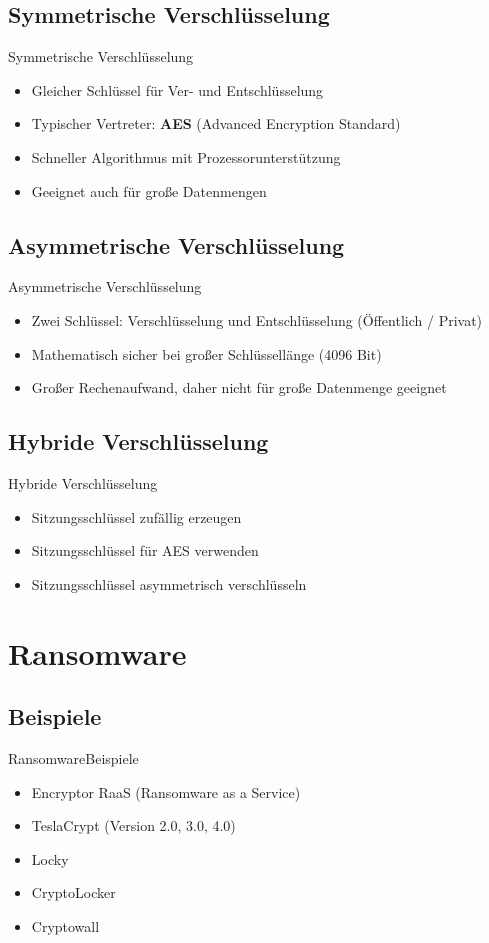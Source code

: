 \documentclass[10pt]{beamer}
\begin{document}
\subsection{Symmetrische Verschlüsselung}
\begin{frame}{Symmetrische Verschlüsselung}
	\begin{itemize}
		\item Gleicher Schlüssel für Ver- und Entschlüsselung
		\item Typischer Vertreter: \textbf{AES} (Advanced Encryption Standard)
		\item Schneller Algorithmus mit Prozessorunterstützung
		\item Geeignet auch für große Datenmengen
	\end{itemize}
\end{frame}
\subsection{Asymmetrische Verschlüsselung}
\begin{frame}{Asymmetrische Verschlüsselung}
	\begin{itemize}
		\item Zwei Schlüssel: Verschlüsselung und Entschlüsselung (Öffentlich / Privat)
		\item Mathematisch sicher bei großer Schlüssellänge (4096 Bit)
		\item Großer Rechenaufwand, daher nicht für große Datenmenge geeignet
	\end{itemize}
\end{frame}
\subsection{Hybride Verschlüsselung}
\begin{frame}{Hybride Verschlüsselung}
	\begin{itemize}
		\item Sitzungsschlüssel zufällig erzeugen
		\item Sitzungsschlüssel für AES verwenden
		\item Sitzungsschlüssel asymmetrisch verschlüsseln
	\end{itemize}
\end{frame}

\section{Ransomware}
\subsection{Beispiele}
\begin{frame}{Ransomware}{Beispiele}
	\begin{itemize}
		\item Encryptor RaaS (Ransomware as a Service)
		\item TeslaCrypt (Version 2.0, 3.0, 4.0)
		\item Locky
		\item CryptoLocker
		\item Cryptowall
	\end{itemize}
\end{frame}
\end{document}
